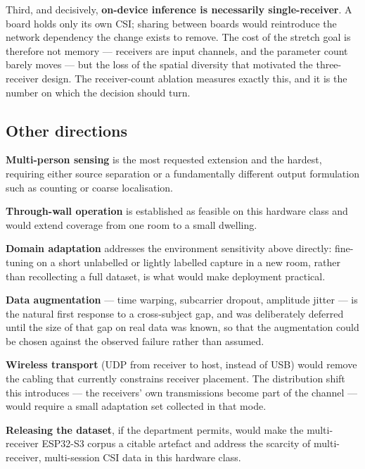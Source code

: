 Third, and decisively, \textbf{on-device inference is necessarily
single-receiver}. A board holds only its own CSI; sharing between boards
would reintroduce the network dependency the change exists to remove. The
cost of the stretch goal is therefore not memory --- receivers are input
channels, and the parameter count barely moves --- but the loss of the
spatial diversity that motivated the three-receiver design. The
receiver-count ablation measures exactly this, and it is the number on which
the decision should turn.

\subsection{Other directions}

\textbf{Multi-person sensing} is the most requested extension and the
hardest, requiring either source separation or a fundamentally different
output formulation such as counting or coarse localisation.

\textbf{Through-wall operation} is established as feasible on this hardware
class \cite{strohmayer2023wall} and would extend coverage from one room to a
small dwelling.

\textbf{Domain adaptation} addresses the environment sensitivity above
directly: fine-tuning on a short unlabelled or lightly labelled capture in a
new room, rather than recollecting a full dataset, is what would make
deployment practical.

\textbf{Data augmentation} --- time warping, subcarrier dropout, amplitude
jitter --- is the natural first response to a cross-subject gap, and was
deliberately deferred until the size of that gap on real data was known, so
that the augmentation could be chosen against the observed failure rather
than assumed.

\textbf{Wireless transport} (UDP from receiver to host, instead of USB)
would remove the cabling that currently constrains receiver placement. The
distribution shift this introduces --- the receivers' own transmissions
become part of the channel --- would require a small adaptation set
collected in that mode.

\textbf{Releasing the dataset}, if the department permits, would make the
multi-receiver ESP32-S3 corpus a citable artefact and address the scarcity
of multi-receiver, multi-session CSI data in this hardware class.
